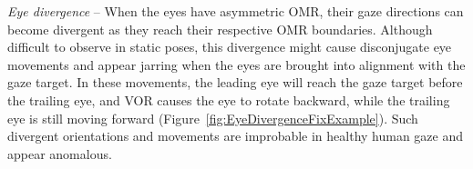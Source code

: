 \noindent\emph{Eye divergence} -- When the eyes have asymmetric OMR, their gaze directions can become divergent as they reach their respective OMR boundaries. Although difficult to observe in static poses, this divergence might cause disconjugate eye movements and appear jarring when the eyes are brought into alignment with the gaze target. In these movements, the leading eye will reach the gaze target before the trailing eye, and VOR causes the eye to rotate backward, while the trailing eye is still moving forward (Figure~\ref{fig:EyeDivergenceFixExample}). %
Such divergent orientations and movements are improbable in healthy human gaze and appear anomalous.